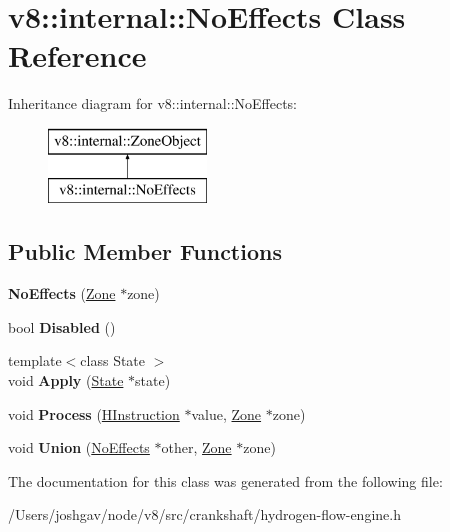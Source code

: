 \hypertarget{classv8_1_1internal_1_1_no_effects}{}\section{v8\+:\+:internal\+:\+:No\+Effects Class Reference}
\label{classv8_1_1internal_1_1_no_effects}
Inheritance diagram for v8\+:\+:internal\+:\+:No\+Effects\+:\begin{figure}[H]
\begin{center}
\leavevmode
\includegraphics[height=2.000000cm]{classv8_1_1internal_1_1_no_effects}
\end{center}
\end{figure}
\subsection*{Public Member Functions}
\begin{DoxyCompactItemize}
\item 
{\bfseries No\+Effects} (\hyperlink{classv8_1_1internal_1_1_zone}{Zone} $\ast$zone)\hypertarget{classv8_1_1internal_1_1_no_effects_a1a45887837888698342d11a81f7baa33}{}\label{classv8_1_1internal_1_1_no_effects_a1a45887837888698342d11a81f7baa33}

\item 
bool {\bfseries Disabled} ()\hypertarget{classv8_1_1internal_1_1_no_effects_a6a2ff3ceffca0c1c7e9b0820322d90af}{}\label{classv8_1_1internal_1_1_no_effects_a6a2ff3ceffca0c1c7e9b0820322d90af}

\item 
{\footnotesize template$<$class State $>$ }\\void {\bfseries Apply} (\hyperlink{classv8_1_1internal_1_1_state}{State} $\ast$state)\hypertarget{classv8_1_1internal_1_1_no_effects_ac783f5f448565d6a6a743d4e626ba486}{}\label{classv8_1_1internal_1_1_no_effects_ac783f5f448565d6a6a743d4e626ba486}

\item 
void {\bfseries Process} (\hyperlink{classv8_1_1internal_1_1_h_instruction}{H\+Instruction} $\ast$value, \hyperlink{classv8_1_1internal_1_1_zone}{Zone} $\ast$zone)\hypertarget{classv8_1_1internal_1_1_no_effects_a81790adf1004bd1def765c5ae246a06c}{}\label{classv8_1_1internal_1_1_no_effects_a81790adf1004bd1def765c5ae246a06c}

\item 
void {\bfseries Union} (\hyperlink{classv8_1_1internal_1_1_no_effects}{No\+Effects} $\ast$other, \hyperlink{classv8_1_1internal_1_1_zone}{Zone} $\ast$zone)\hypertarget{classv8_1_1internal_1_1_no_effects_aa1ab37c6e6905a6389a82ea6630eee84}{}\label{classv8_1_1internal_1_1_no_effects_aa1ab37c6e6905a6389a82ea6630eee84}

\end{DoxyCompactItemize}


The documentation for this class was generated from the following file\+:\begin{DoxyCompactItemize}
\item 
/\+Users/joshgav/node/v8/src/crankshaft/hydrogen-\/flow-\/engine.\+h\end{DoxyCompactItemize}
